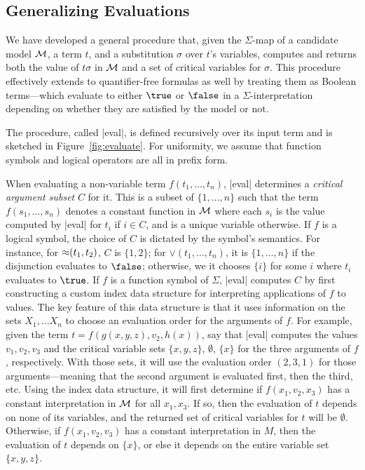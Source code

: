 \documentclass{svjour3}                     %
\begin{document}
\subsection{Generalizing Evaluations}

We have developed a general procedure that,
given the $\Sigma$-map of a candidate model $\mathcal{M}$, a term $t$, and 
a substitution $\sigma$ over $t$'s variables,
computes and returns both the value of $t\sigma$ in $\mathcal{M}$ and 
a set of critical variables for $\sigma$.
This procedure effectively extends to quantifier-free formulas as well
by treating them as Boolean terms---which evaluate to either $\true$ or $\false$ 
in a $\Sigma$-interpretation depending
on whether they are satisfied by the model or not.

The procedure, called |eval|, is defined recursively over its input term and 
is sketched in Figure~\ref{fig:evaluate}. 
For uniformity, we assume that function symbols and logical operators
are all in prefix form.

When evaluating a non-variable term $f(t_1, \ldots, t_n)$, 
|eval| determines a \emph{critical argument subset} $C$ for it.
This is a subset of $\{1,\ldots,n\}$ such that
the term $f(s_1, \ldots, s_n)$ denotes a constant function in $\mathcal{M}$
where each $s_i$ is the value computed by |eval| for $t_i$ if $i \in C$, and 
is a unique variable otherwise.
If $f$ is a logical symbol, the choice of $C$ is dictated 
by the symbol's semantics.
For instance, for ${\approx}(t_1, t_2)$, $C$ is $\{1,2\}$;
for $\lor(t_1, \ldots, t_n)$,
it is $\{1,\ldots,n\}$ 
if the disjunction evaluates to $\false$;
otherwise, we it chooses $\{i\}$ for some $i$ where $t_i$ 
evaluates to $\true$.
If $f$ is a function symbol of $\Sigma$, 
|eval| computes $C$ by first constructing a custom index data structure 
for interpreting applications of $f$ to values.
The key feature of this data structure is that it uses information 
on the sets $X_1, \ldots X_n$ to choose an evaluation order 
for the arguments of $f$.
For example, given the term $t = f( g( x, y, z ), v_2, h( x ))$,
say that |eval| computes the values $v_1, v_2, v_3$ and the critical variable sets
$\{ x,y,z \}$, $\emptyset$, $\{x\}$ for the three arguments of $f$, respectively.
With those sets, it will use the evaluation order $(2, 3, 1)$ 
for those arguments---meaning that 
the second argument is evaluated first, then the third, etc.
Using the index data structure, it will first determine 
if $f( x_1, v_2, x_3 )$ has a constant interpretation in $\mathcal{M}$ for all $x_1, x_3$.
If so, then the evaluation of $t$ depends on none of its variables,
and the returned set of critical variables for $t$ will be $\emptyset$.
Otherwise, if $f( x_1, v_2, v_3 )$ has a constant interpretation in $M$, 
then the evaluation of $t$ depends on $\{ x \}$, or else
it depends on the entire variable set $\{ x, y, z \}$.
\end{document}
